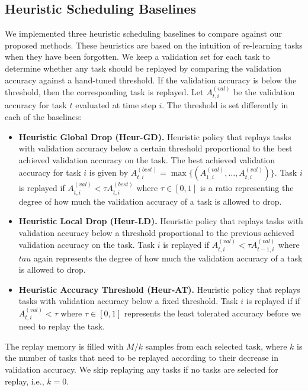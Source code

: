 
\subsection*{Heuristic Scheduling Baselines}\label{paperD:app:heuristic_scheduling_baselines}

We implemented three heuristic scheduling baselines to compare against our proposed methods. These heuristics are based on the intuition of re-learning tasks when they have been forgotten. We keep a validation set for each task to determine whether any task should be replayed by comparing the validation accuracy against a hand-tuned threshold. If the validation accuracy is below the threshold, then the corresponding task is replayed. Let $A_{t, i}^{(val)}$ be the validation accuracy for task $t$ evaluated at time step $i$. The threshold is set differently in each of the baselines:
\begin{itemize}[topsep=1pt,noitemsep]%
    \item {\bf Heuristic Global Drop (Heur-GD).} Heuristic policy that replays tasks  
    with validation accuracy below a certain threshold proportional to the best achieved validation accuracy on the task. The best achieved validation accuracy for task $i$ is given by $A_{t, i}^{(best)} = \max\{(A_{1, i}^{(val)}, \dots, A_{t, i}^{(val)})\}$. Task $i$ is replayed if $A_{t, i}^{(val)} < \tau A_{t, i}^{(best)}$ where $\tau \in [0, 1]$ is a ratio representing the degree of how much the validation accuracy of a task is allowed to drop. 

    \item {\bf Heuristic Local Drop (Heur-LD).} Heuristic policy that replays tasks with validation accuracy below a threshold proportional to the previous achieved validation accuracy on the task. Task $i$ is replayed if $A_{t, i}^{(val)} < \tau A_{t-1, i}^{(val)}$ where $tau$ again represents the degree of how much the validation accuracy of a task is allowed to drop. 

    \item {\bf Heuristic Accuracy Threshold (Heur-AT).} Heuristic policy that replays tasks with validation accuracy below a fixed threshold. Task $i$ is replayed if if $A_{t, i}^{(val)} < \tau$ where $\tau \in [0, 1]$ represents the least tolerated accuracy before we need to replay the task. 
\end{itemize}
The replay memory is filled with $M/k$ samples from each selected task, where $k$ is the number of tasks that need to be replayed according to their decrease in validation accuracy. We skip replaying any tasks if no tasks are selected for replay, i.e., $k=0$. 


